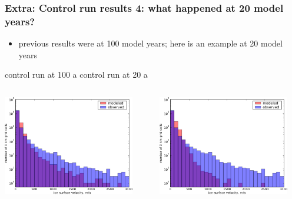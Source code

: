 \documentclass{beamer}
\begin{document}
\begin{frame}
  \frametitle{Extra: Control run results 4: what happened at 20 model years?}

\begin{itemize}
\item previous results were at 100 model years; here is an example at 20 model years
\end{itemize}

\begin{center}
control run at 100 a \hfill control run at 20 a
\end{center}

\begin{columns}
\begin{column}{0.5\textwidth}
\scriptsize
\begin{center}
  \includegraphics[width=0.9\textwidth]{g3km_3_25_98_hist}
\end{center}
\end{column}
\begin{column}{0.5\textwidth}
\begin{center}
  \includegraphics[width=0.9\textwidth]{g3km_3_25_98_early_hist}
\end{center}
\end{column}
\end{columns}
\end{frame}
\end{document}
